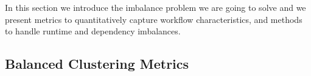\documentclass[final]{IEEEtran}
\begin{document}
In this section we introduce the imbalance problem we are going to solve and we present metrics to quantitatively capture workflow characteristics, and methods to handle runtime and dependency imbalances.


\subsection{Balanced Clustering Metrics}


\end{document}
